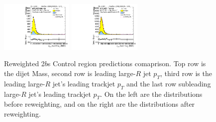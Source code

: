 \begin{figure}[htbp!]
\begin{center}
\includegraphics[width=0.31\textwidth,angle=-90]{figures/boosted/Prereweight/Moriond_TwoTag_split_Control_sublHCand_trk0_Pt.pdf}
\includegraphics[width=0.31\textwidth,angle=-90]{figures/boosted/Control/b77_TwoTag_split_Control_sublHCand_trk0_Pt.pdf}\\
\caption{Reweighted 2$b$s Control region predictions comaprison. Top row is the dijet Mass, second row is leading large-$R$ jet $p_{T}$, third row is the leading large-$R$ jet's leading trackjet $p_T$ and the last row subleading large-$R$ jet's leading trackjet $p_T$. On the left are the distributions before reweighting, and on the right are the distributions after reweighting.}
\label{fig:rw-2bs-comp-cr}
\end{center}
\end{figure}


